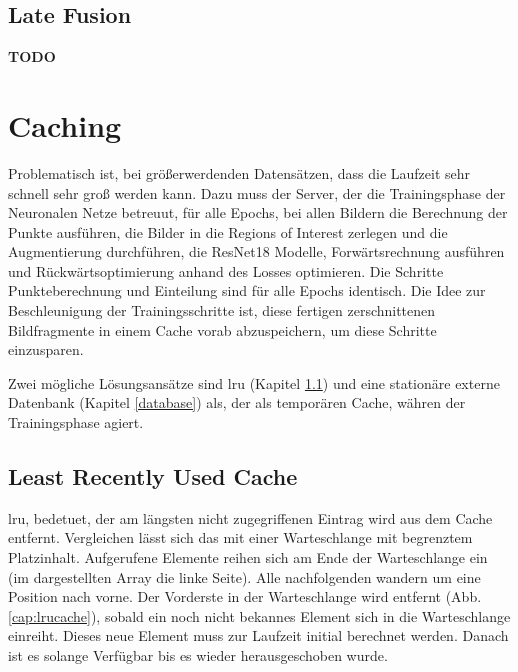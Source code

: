 \subsection{Late Fusion}\label{latefusion_method}
\textbf{TODO }






































\clearpage
\section{Caching}\label{caching}
Problematisch ist, bei größerwerdenden Datensätzen, dass die Laufzeit sehr schnell sehr groß werden kann. Dazu muss der Server, der die Trainingsphase der Neuronalen Netze betreuut, für alle Epochs, bei allen Bildern die Berechnung der Punkte ausführen, die Bilder in die Regions of Interest zerlegen und die Augmentierung durchführen, die ResNet18 Modelle, Forwärtsrechnung ausführen und Rückwärtsoptimierung anhand des Losses optimieren. Die Schritte Punkteberechnung und Einteilung sind für alle Epochs identisch. Die Idee zur Beschleunigung der Trainingsschritte ist, diese fertigen zerschnittenen Bildfragmente in einem Cache vorab abzuspeichern, um diese Schritte einzusparen.

Zwei mögliche Lösungsansätze sind \ac{lru} (Kapitel \ref{lrucache}) und eine stationäre externe Datenbank (Kapitel \ref{database}) als, der als temporären Cache, währen der Trainingsphase agiert.

\subsection{Least Recently Used Cache}\label{lrucache}
\ac{lru}, bedetuet, der am längsten nicht zugegriffenen Eintrag wird aus dem Cache entfernt. Vergleichen lässt sich das mit einer Warteschlange mit begrenztem Platzinhalt. Aufgerufene Elemente reihen sich am Ende der Warteschlange ein (im dargestellten Array die linke Seite). Alle nachfolgenden wandern um eine Position nach vorne. Der Vorderste in der Warteschlange wird entfernt (Abb. \ref{cap:lrucache}), sobald ein noch nicht bekannes Element sich in die Warteschlange einreiht. Dieses neue Element muss zur Laufzeit initial berechnet werden. Danach ist es solange Verfügbar bis es wieder herausgeschoben wurde.

